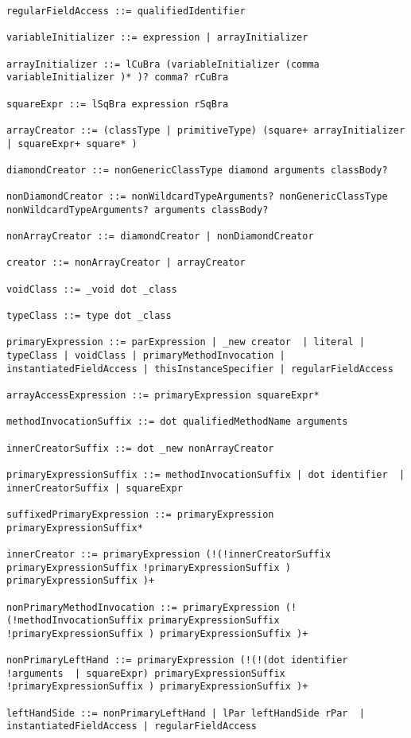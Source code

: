 \begin{lstlisting}[breaklines=true]
regularFieldAccess ::= qualifiedIdentifier

variableInitializer ::= expression | arrayInitializer

arrayInitializer ::= lCuBra (variableInitializer (comma variableInitializer )* )? comma? rCuBra

squareExpr ::= lSqBra expression rSqBra

arrayCreator ::= (classType | primitiveType) (square+ arrayInitializer  | squareExpr+ square* )

diamondCreator ::= nonGenericClassType diamond arguments classBody?

nonDiamondCreator ::= nonWildcardTypeArguments? nonGenericClassType nonWildcardTypeArguments? arguments classBody?

nonArrayCreator ::= diamondCreator | nonDiamondCreator

creator ::= nonArrayCreator | arrayCreator

voidClass ::= _void dot _class

typeClass ::= type dot _class

primaryExpression ::= parExpression | _new creator  | literal | typeClass | voidClass | primaryMethodInvocation | instantiatedFieldAccess | thisInstanceSpecifier | regularFieldAccess

arrayAccessExpression ::= primaryExpression squareExpr*

methodInvocationSuffix ::= dot qualifiedMethodName arguments

innerCreatorSuffix ::= dot _new nonArrayCreator

primaryExpressionSuffix ::= methodInvocationSuffix | dot identifier  | innerCreatorSuffix | squareExpr

suffixedPrimaryExpression ::= primaryExpression primaryExpressionSuffix*

innerCreator ::= primaryExpression (!(!innerCreatorSuffix primaryExpressionSuffix !primaryExpressionSuffix ) primaryExpressionSuffix )+

nonPrimaryMethodInvocation ::= primaryExpression (!(!methodInvocationSuffix primaryExpressionSuffix !primaryExpressionSuffix ) primaryExpressionSuffix )+

nonPrimaryLeftHand ::= primaryExpression (!(!(dot identifier !arguments  | squareExpr) primaryExpressionSuffix !primaryExpressionSuffix ) primaryExpressionSuffix )+

leftHandSide ::= nonPrimaryLeftHand | lPar leftHandSide rPar  | instantiatedFieldAccess | regularFieldAccess


\end{lstlisting}
